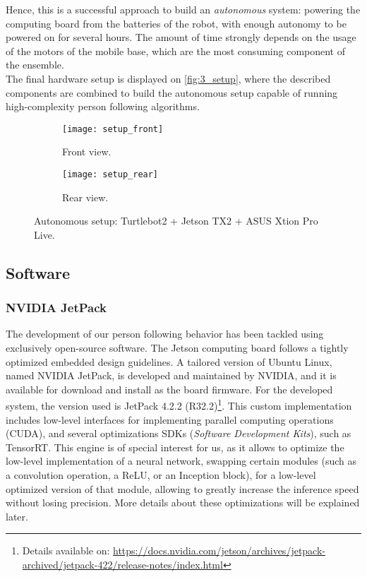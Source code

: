 Hence, this is a successful approach to build an \textit{autonomous} system: powering the computing board from the batteries of the robot, with enough autonomy to be powered on for several hours. The amount of time strongly depends on the usage of the motors of the mobile base, which are the most consuming component of the ensemble.\\

The final hardware setup is displayed on \autoref{fig:3_setup}, where the described components are combined to build the autonomous setup capable of running high-complexity person following algorithms.\\

\begin{figure}[h]
	\centering
	\begin{subfigure}[h]{0.45\linewidth}
		\centering
		\texttt{[image: setup\_front]}
		\caption{Front view.}
	\end{subfigure}
	\begin{subfigure}[h]{0.45\linewidth}
		\centering
		\texttt{[image: setup\_rear]}
		\caption{Rear view.}
	\end{subfigure}
	\caption{Autonomous setup: Turtlebot2 + Jetson TX2 + ASUS Xtion Pro Live.}
	\label{fig:3_setup}
\end{figure}

\newpage
\subsection{Software}
\label{sec:3_sw}
\subsubsection{NVIDIA JetPack}
The development of our person following behavior has been tackled using exclusively open-source software. The Jetson computing board follows a tightly optimized embedded design guidelines. A tailored version of Ubuntu Linux, named NVIDIA JetPack, is developed and maintained by NVIDIA, and it is available for download and install as the board firmware. For the developed system, the version used is JetPack 4.2.2 (R32.2)\footnote{Details available on: \url{https://docs.nvidia.com/jetson/archives/jetpack-archived/jetpack-422/release-notes/index.html}}. This custom implementation includes low-level interfaces for implementing parallel computing operations (CUDA), and several optimizations SDKs (\textit{Software Development Kits}), such as TensorRT. This engine is of special interest for us, as it allows to optimize the low-level implementation of a neural network, swapping certain modules (such as a convolution operation, a ReLU, or an Inception block), for a low-level optimized version of that module, allowing to greatly increase the inference speed without losing precision. More details about these optimizations will be explained later.\\

